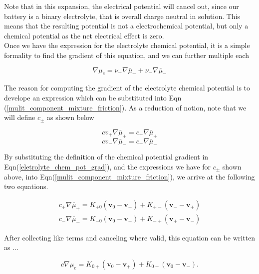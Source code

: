 \documentclass[lettersize,journal]{IEEEtran}
\begin{document}
Note that in this expansion, the electrical potential will cancel out, since our battery is a binary electrolyte, that is overall charge neutral in solution. This means that the resulting potential is not a electrochemical potential, but only a chemical potential as the net electrical effect is zero. \\

Once we have the expression for the electrolyte chemical potential, it is a simple formality to find the gradient of this equation, and we can further multiple each

\begin{equation}\label{eletrolyte_chem_pot_grad}
\nabla \mu_{e}=\nu_{+} \nabla \bar{\mu}_{+}+\nu_{-} \nabla \bar{\mu}_{-}
\end{equation}


The reason for computing the gradient of the electrolyte chemical potential is to develope an expression which can be substituted into Eqn (\ref{mulit_component_mixture_friction}). As a reduction of notion, note that we will define $c_{\pm}$ as shown below


\begin{equation}\label{stoich_concentration_pos}
c v_{+} \nabla \bar{\mu}_{+}=c_{+} \nabla \bar{\mu}_{+}
\end{equation}
\begin{equation}\label{stoich_concentration_neg}
   c v_{-} \nabla \bar{\mu}_{-}=c_{-} \nabla \bar{\mu}_{-}
\end{equation}

By substituting the definition of the chemical potential gradient in Eqn(\ref{eletrolyte_chem_pot_grad}), and the expressions we have for $c_{\pm}$ shown above, into Eqn(\ref{mulit_component_mixture_friction}), we arrive at the following two equations.

\begin{equation}
\begin{array}{l}
c_{+} \nabla \bar{\mu}_{+}=K_{+0}\left(\mathbf{v}_{0}-\mathbf{v}_{+}\right)+K_{+-}\left(\mathbf{v}_{-}-\mathbf{v}_{+}\right) \\
c_{-} \nabla \bar{\mu}_{-}=K_{-0}\left(\mathbf{v}_{0}-\mathbf{v}_{-}\right)+K_{-+}\left(\mathbf{v}_{+}-\mathbf{v}_{-}\right)
\end{array}
\end{equation}

After collecting like terms and canceling where valid, this equation can be written as ...

\begin{equation}
c \nabla \mu_{e}= K_{0+}\left(\mathbf{v}_{0}-\mathbf{v}_{+}\right)+K_{0-}\left(\mathbf{v}_{0}-\mathbf{v}_{-}\right) .
\end{equation}
\end{document}
